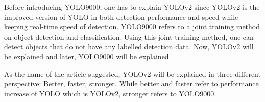 \documentclass{article}
\begin{document}
\setlength{\parindent}{6ex}

\indent

Before introducing YOLO9000, one has to explain YOLOv2 since YOLOv2 
is the improved version of YOLO in both detection performance and speed 
while keeping real-time speed of detection. YOLO9000 refers to a joint 
training method on object detection and classification. Using this 
joint training method, one can detect objects that do not have any 
labelled detection data. Now, YOLOv2 will be explained and later, 
YOLO9000 will be explained. \par

As the name of the article suggested, YOLOv2 will be explained in three 
different perspective: Better, faster, stronger. While better and faster 
refer to performance increase of YOLO which is YOLOv2, stronger refers to 
YOLO9000. 
\end{document}
